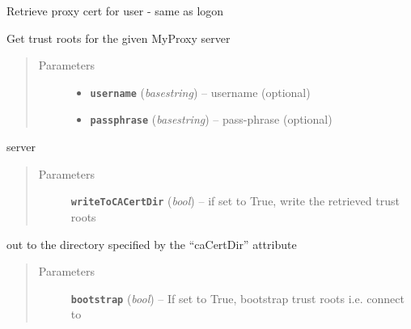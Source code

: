\documentclass[letterpaper,10pt,english]{sphinxmanual}
\begin{document}
\begin{fulllineitems}
\begin{fulllineitems}
\end{fulllineitems}


\begin{fulllineitems}
\label{client:myproxy.client.MyProxyClient.getDelegation}
Retrieve proxy cert for user - same as logon

\end{fulllineitems}


\begin{fulllineitems}
\label{client:myproxy.client.MyProxyClient.getTrustRoots}
Get trust roots for the given MyProxy server
\begin{quote}\begin{description}
\item[{Parameters}] \leavevmode\begin{itemize}
\item {} 
\textbf{\texttt{username}} (\emph{basestring}) -- username (optional)

\item {} 
\textbf{\texttt{passphrase}} (\emph{basestring}) -- pass-phrase (optional)

\end{itemize}

\end{description}\end{quote}

server
\begin{quote}\begin{description}
\item[{Parameters}] \leavevmode
\textbf{\texttt{writeToCACertDir}} (\emph{bool}) -- if set to True, write the retrieved trust roots

\end{description}\end{quote}

out to the directory specified by the ``caCertDir'' attribute
\begin{quote}\begin{description}
\item[{Parameters}] \leavevmode
\textbf{\texttt{bootstrap}} (\emph{bool}) -- If set to True, bootstrap trust roots i.e. connect to


\end{description}
\end{quote}
\end{fulllineitems}
\end{fulllineitems}
\end{document}

